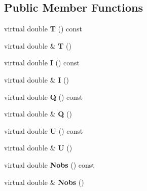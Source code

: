 \subsection*{Public Member Functions}
\begin{DoxyCompactItemize}
\item 
\hypertarget{classBasePixel_a4c13befcf80b0135a7fe0ff65cb17043}{
virtual double {\bfseries T} () const }
\label{classBasePixel_a4c13befcf80b0135a7fe0ff65cb17043}

\item 
\hypertarget{classBasePixel_a7e227923b388d0358bdc7d0ac01b199e}{
virtual double \& {\bfseries T} ()}
\label{classBasePixel_a7e227923b388d0358bdc7d0ac01b199e}

\item 
\hypertarget{classBasePixel_aa2b4c5185448ca048afb8664aa845b5b}{
virtual double {\bfseries I} () const }
\label{classBasePixel_aa2b4c5185448ca048afb8664aa845b5b}

\item 
\hypertarget{classBasePixel_a4be31487ee0a118e990f5ed7e04411a3}{
virtual double \& {\bfseries I} ()}
\label{classBasePixel_a4be31487ee0a118e990f5ed7e04411a3}

\item 
\hypertarget{classBasePixel_abd169a21ce2c693e234385207d52893f}{
virtual double {\bfseries Q} () const }
\label{classBasePixel_abd169a21ce2c693e234385207d52893f}

\item 
\hypertarget{classBasePixel_aa37bafa4b3d3f1f73237776ef587929f}{
virtual double \& {\bfseries Q} ()}
\label{classBasePixel_aa37bafa4b3d3f1f73237776ef587929f}

\item 
\hypertarget{classBasePixel_ae7e1daf53b4c92842f0232d45c1944a3}{
virtual double {\bfseries U} () const }
\label{classBasePixel_ae7e1daf53b4c92842f0232d45c1944a3}

\item 
\hypertarget{classBasePixel_aa3e4eaadd454f84e629f60e9a5dc116c}{
virtual double \& {\bfseries U} ()}
\label{classBasePixel_aa3e4eaadd454f84e629f60e9a5dc116c}

\item 
\hypertarget{classBasePixel_abee03a57205e275a5403654d69358f1b}{
virtual double {\bfseries Nobs} () const }
\label{classBasePixel_abee03a57205e275a5403654d69358f1b}

\item 
\hypertarget{classBasePixel_aae72a13c7efb6d6af332327ddecba607}{
virtual double \& {\bfseries Nobs} ()}
\label{classBasePixel_aae72a13c7efb6d6af332327ddecba607}


\end{DoxyCompactItemize}
